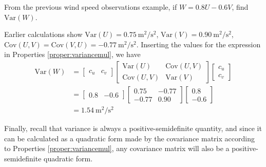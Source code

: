 \begin{exmp}
From the previous wind speed observations example, if $W = 0.8U-0.6V$, find $\text{Var}(W)$.
\end{exmp}
\begin{solution}
Earlier calculations show $\text{Var}(U) = \SI{0.75}{\square\m \per \square\s}$,
$\text{Var}(V) = \SI{0.90}{\square\m \per \square\s}$, $\text{Cov}(U,V) = \text{Cov}(V,U) = \SI{-0.77}{\square\m \per \square\s}$. Inserting the values for the expression in Properties \ref{proper:variancemul}, we have
\begin{align*}
\text{Var}(W) &=
\begin{bmatrix}
c_u & c_v
\end{bmatrix}
\begin{bmatrix}
\text{Var}(U) & \text{Cov}(U,V) \\
\text{Cov}(U,V) & \text{Var}(V)
\end{bmatrix}
\begin{bmatrix}
c_u \\
c_v
\end{bmatrix} \\
&=
\begin{bmatrix}
0.8 & -0.6
\end{bmatrix}
\begin{bmatrix}
0.75 & -0.77 \\
-0.77 & 0.90
\end{bmatrix}
\begin{bmatrix}
0.8 \\
-0.6
\end{bmatrix} \\
&= \SI{1.54}{\square\m \per \square\s}
\end{align*} 
\end{solution}
Finally, recall that variance is always a positive-semidefinite quantity, and since it can be calculated as a quadratic form made by the covariance matrix according to Properties \ref{proper:variancemul}, any covariance matrix will also be a positive-semidefinite quadratic form.

